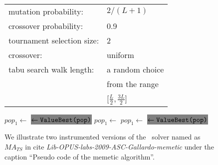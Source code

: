 \begin{figure*}[t!]
\begin{minipage}[t]{0.49\linewidth}
{\begin{tabular}{l l}
 mutation probability: & $2/(L+1)$ \\
 crossover probability: & 0.9 \\
 tournament selection size: & 2 \\
 crossover: & uniform \\
 tabu search walk length: & a random choice  \\
 ~~              &  from the range\\
 ~~              & {\small [$\frac{L}{2}, \frac{3 L}{2}$]}
\end{tabular}
}
\vspace{0.6cm}
\centering
\begin{algorithmic}[1]
\STATE $pop_1\gets$ 
\STATE {}
\STATE \colorbox{Gray} { $\gets \texttt{{ValueBest}(pop)}$}
        \STATE $\mathit{pop_1} \gets $
        \STATE $\mathit{pop_1} \gets $
        \STATE {}
        \STATE \colorbox{Gray}{ $\gets \texttt{{ValueBest}(pop)}$}
\ENDWHILE
\ENDPROCEDURE 
\end{algorithmic}
\vspace{0.18cm}
\label{fg-lssMAts-lssRRts-b}
\end{minipage}
\caption[Figure file: fg-lssMAts-lssRRts.tex]{We illustrate two instrumented versions of the \labs\ solver named as $MA_{TS}$
in cite {\em Lib-OPUS-labs-2009-ASC-Gallardo-memetic}  
under the caption ``Pseudo code of the memetic algorithm''.} 
\label{fg-lssMAts-lssRRts}
\end{figure*}
 